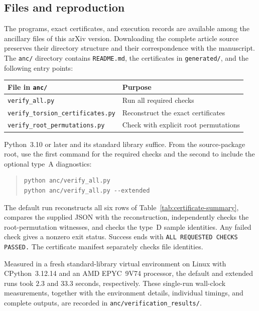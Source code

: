 \subsection{Files and reproduction}
The programs, exact certificates, and execution records are available among the ancillary files of this arXiv version. Downloading the complete article source preserves their directory structure and their correspondence with the manuscript. The \texttt{anc/} directory contains \texttt{README.md}, the certificates in \texttt{generated/}, and the following entry points:
\begin{center}
\small
\begin{tabular}{@{}ll@{}}
\toprule
File in \texttt{anc/} & Purpose\\
\midrule
\texttt{verify\_all.py} & Run all required checks\\
\texttt{verify\_torsion\_certificates.py} & Reconstruct the exact certificates\\
\texttt{verify\_root\_permutations.py} & Check with explicit root permutations\\
\bottomrule
\end{tabular}
\end{center}

Python~3.10 or later and its standard library suffice. From the source-package root, use the first command for the required checks and the second to include the optional type~A diagnostics:
\begin{quote}
\small
\begin{verbatim}
python anc/verify_all.py
python anc/verify_all.py --extended
\end{verbatim}
\end{quote}
The default run reconstructs all six rows of Table~\ref{tab:certificate-summary}, compares the supplied JSON with the reconstruction, independently checks the root-permutation witnesses, and checks the type~D sample identities. Any failed check gives a nonzero exit status. Success ends with \mbox{\texttt{ALL REQUESTED CHECKS PASSED.}} The certificate manifest separately checks file identities.

Measured in a fresh standard-library virtual environment on Linux with CPython~3.12.14 and an AMD EPYC~9V74 processor, the default and extended runs took $2.3$ and $33.3$ seconds, respectively. These single-run wall-clock measurements, together with the environment details, individual timings, and complete outputs, are recorded in \texttt{anc/verification\_results/}.

